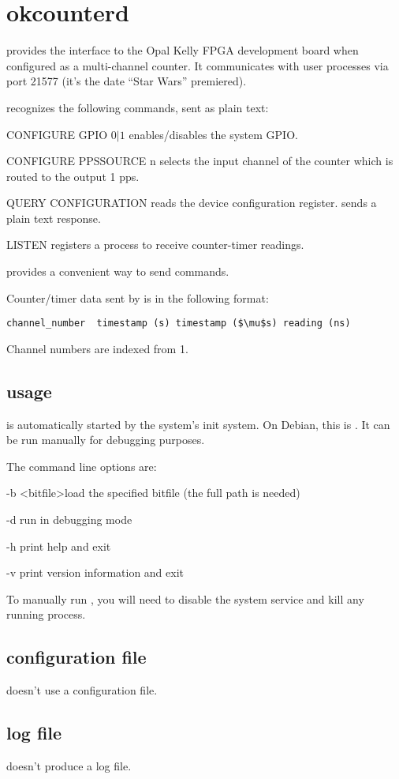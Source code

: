 
\section{okcounterd \label{sokcounterd}}

 provides the interface to the Opal Kelly FPGA development board when configured as a multi-channel counter.
It communicates with user processes via port 21577 (it's the date ``Star Wars'' premiered).

 recognizes the following commands, sent as plain text:
\begin{description*}
	\item[] CONFIGURE GPIO $0\vert1$ enables/disables the system GPIO.
	\item[] CONFIGURE PPSSOURCE n selects the input channel of the counter which is
	routed to the output 1 pps. 
	\item[] QUERY CONFIGURATION reads the device configuration register.  sends
	a plain text response.
	\item[] LISTEN registers a process to receive counter-timer readings.
\end{description*}
 provides a convenient way to send commands.

Counter/timer data sent by  is in the following format:
\begin{lstlisting}
channel_number  timestamp (s) timestamp ($\mu$s) reading (ns)
\end{lstlisting}
Channel numbers are indexed from 1.

\subsection{usage}
 is automatically started by the system's init system. On Debian, this is . 
It can be run manually for debugging purposes.

The command line options are:
\begin{description*}
	\item[-b] \textless bitfile\textgreater load the specified bitfile (the full path is needed)
	\item[-d]	run in debugging mode
	\item[-h]	print help and exit
	\item[-v]	print version information and exit
\end{description*}
To manually run , you will need to disable the system service
and kill any running  process.

\subsection{configuration file}
 doesn't use a configuration file.

\subsection{log file}
 doesn't produce a log file.